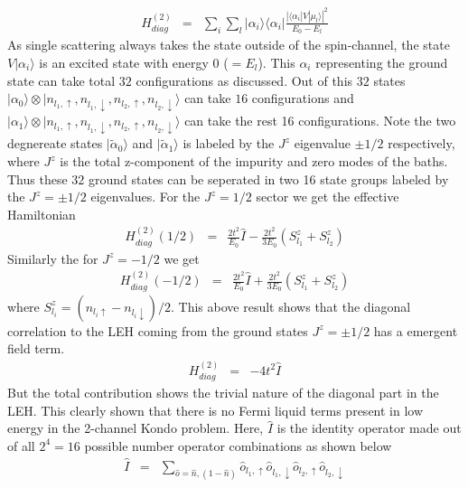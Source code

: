 \documentclass[reprint,prb,superscriptaddress]{revtex4-1}
\begin{document}
\begin{eqnarray}
H^{(2)}_{diag} &=& \sum_{i} \sum_l |\alpha_i\rangle\langle \alpha_i | \frac{|\langle \alpha_i  | V| \mu_l \rangle|^2 }{E_0-E_{l}}
\end{eqnarray}
As single scattering always takes the state outside of the spin-channel, the state $V|\alpha_i\rangle$ is an excited state with energy $0$ ($=E_l$). This $\alpha_i$ representing the ground state can take total $32$ configurations as discussed. Out of this $32$ states $| {\alpha}_0\rangle\otimes |n_{l_1,\uparrow},n_{l_1,\downarrow},n_{l_2,\uparrow},n_{l_2,\downarrow}\rangle$ can take $16$ configurations and $| {\alpha}_1\rangle\otimes |n_{l_1,\uparrow},n_{l_1,\downarrow},n_{l_2,\uparrow},n_{l_2,\downarrow}\rangle$ can take the rest 16 configurations. Note the two degnereate states $|\tilde{\alpha}_0\rangle$  and $|\tilde{\alpha}_1\rangle$ is labeled by the $J^z$ eigenvalue $\pm 1/2$ respectively, where $J^z$ is the total z-component of the impurity and zero modes of the baths. Thus these $32$ ground states can be seperated in two 16 state groups labeled by the $J^z=\pm 1/2$ eigenvalues. For the $J^z=1/2$ sector we get the effective Hamiltonian
\begin{eqnarray}
H^{(2)}_{diag} (1/2) &=& \frac{2t^2}{E_0} \hat{I} - \frac{2t^2}{3E_0} ( S_{l_1}^z + S_{l_2}^z)
\end{eqnarray}
Similarly the for $J^z=-1/2$ we get 
\begin{eqnarray}
H^{(2)}_{diag} (-1/2) &=& \frac{2t^2}{E_0} \hat{I} + \frac{2t^2}{3E_0} (S_{l_1}^z+S_{l_2}^z)
\end{eqnarray}
where $S_{l_i}^z=(n_{l_i\uparrow}-n_{l_i\downarrow})/2.$ This above result shows that the diagonal correlation to the LEH coming from the ground states $J^z=\pm 1/2$ has a emergent field term. 
\begin{eqnarray}
H^{(2)}_{diag} &=& -4t^2 \hat{I}
\end{eqnarray}
But the total contribution shows the trivial nature of the diagonal part in the LEH. This clearly shown that there is no Fermi liquid terms present in low energy in the 2-channel Kondo problem. Here, $\hat{I}$ is the identity operator made out of all $2^4=16$ possible number operator combinations as shown below
\begin{eqnarray}
\hat{I} &=& \sum_{\hat{o}=\hat{n},(1-\hat{n})} \hat{o}_{l_1,\uparrow}\hat{o}_{l_1,\downarrow} \hat{o}_{l_2,\uparrow}\hat{o}_{l_2,\downarrow}
\end{eqnarray}
\end{document}
